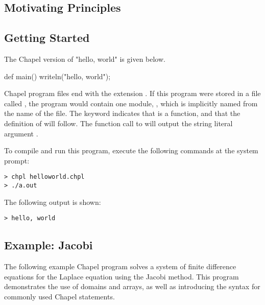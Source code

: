 \label{Language_Overview}

\subsection{Motivating Principles}

\subsection{Getting Started}

The Chapel version of "hello, world" is given below.
\begin{chapel}
def main() {
  writeln("hello, world");
}
\end{chapel}
Chapel program files end with the extension .  
If this program were stored in a file called ,
the program would contain one module, , which is implicitly
named from the name of the file.  The keyword  indicates that 
 is a function, and that the definition of  will 
follow.  The function call to  will output the string
literal argument .

To compile and run this program, execute the following
commands at the system prompt:
\begin{verbatim} 
> chpl helloworld.chpl
> ./a.out
\end{verbatim}
The following output is shown:
\begin{verbatim}
> hello, world
\end{verbatim}

\subsection{Example: Jacobi}
The following example Chapel program solves a system of finite difference
equations for the Laplace equation using the Jacobi method.  This program 
demonstrates the use
of domains and arrays, as well as introducing the syntax for commonly used
Chapel statements.

